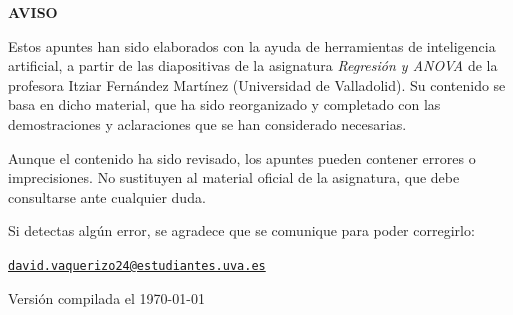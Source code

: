 \thispagestyle{empty}
\begin{center}
  {\Huge\bfseries AVISO\par}
\end{center}
\vspace{1cm}

\setlength{\parindent}{1.5em}
Estos apuntes han sido elaborados con la ayuda de herramientas de inteligencia artificial, a
partir de las diapositivas de la asignatura \emph{Regresión y ANOVA} de la profesora Itziar
Fernández Martínez (Universidad de Valladolid). Su contenido se basa en dicho material, que ha
sido reorganizado y completado con las demostraciones y aclaraciones que se han considerado
necesarias.

Aunque el contenido ha sido revisado, los apuntes pueden contener errores o imprecisiones. No
sustituyen al material oficial de la asignatura, que debe consultarse ante cualquier duda.

Si detectas algún error, se agradece que se comunique para poder corregirlo:

\begin{center}
  \href{mailto:david.vaquerizo24@estudiantes.uva.es}{\texttt{david.vaquerizo24@estudiantes.uva.es}}
\end{center}
\setlength{\parindent}{0pt}

\vfill
\begin{center}
  {\small Versión compilada el \today\par}
\end{center}
\clearpage
